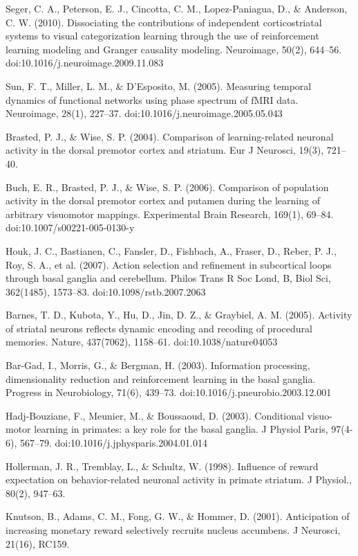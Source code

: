 Seger, C. A., Peterson, E. J., Cincotta, C. M., Lopez-Paniagua, D., & Anderson, C. W. (2010). Dissociating the contributions of independent corticostriatal systems to visual categorization learning through the use of reinforcement learning modeling and Granger causality modeling. Neuroimage, 50(2), 644–56. doi:10.1016/j.neuroimage.2009.11.083

Sun, F. T., Miller, L. M., & D'Esposito, M. (2005). Measuring temporal dynamics of functional networks using phase spectrum of fMRI data. Neuroimage, 28(1), 227–37. doi:10.1016/j.neuroimage.2005.05.043

Brasted, P. J., & Wise, S. P. (2004). Comparison of learning-related neuronal activity in the dorsal premotor cortex and striatum. Eur J Neurosci, 19(3), 721–40.

Buch, E. R., Brasted, P. J., & Wise, S. P. (2006). Comparison of population activity in the dorsal premotor cortex and putamen during the learning of arbitrary visuomotor mappings. Experimental Brain Research, 169(1), 69–84. doi:10.1007/s00221-005-0130-y

Houk, J. C., Bastianen, C., Fansler, D., Fishbach, A., Fraser, D., Reber, P. J., Roy, S. A., et al. (2007). Action selection and refinement in subcortical loops through basal ganglia and cerebellum. Philos Trans R Soc Lond, B, Biol Sci, 362(1485), 1573–83. doi:10.1098/rstb.2007.2063

Barnes, T. D., Kubota, Y., Hu, D., Jin, D. Z., & Graybiel, A. M. (2005). Activity of striatal neurons reflects dynamic encoding and recoding of procedural memories. Nature, 437(7062), 1158–61. doi:10.1038/nature04053

Bar-Gad, I., Morris, G., & Bergman, H. (2003). Information processing, dimensionality reduction and reinforcement learning in the basal ganglia. Progress in Neurobiology, 71(6), 439–73. doi:10.1016/j.pneurobio.2003.12.001

Hadj-Bouziane, F., Meunier, M., & Boussaoud, D. (2003). Conditional visuo-motor learning in primates: a key role for the basal ganglia. J Physiol Paris, 97(4-6), 567–79. doi:10.1016/j.jphysparis.2004.01.014

Hollerman, J. R., Tremblay, L., & Schultz, W. (1998). Influence of reward expectation on behavior-related neuronal activity in primate striatum. J Physiol., 80(2), 947–63.

Knutson, B., Adams, C. M., Fong, G. W., & Hommer, D. (2001). Anticipation of increasing monetary reward selectively recruits nucleus accumbens. J Neurosci, 21(16), RC159.

